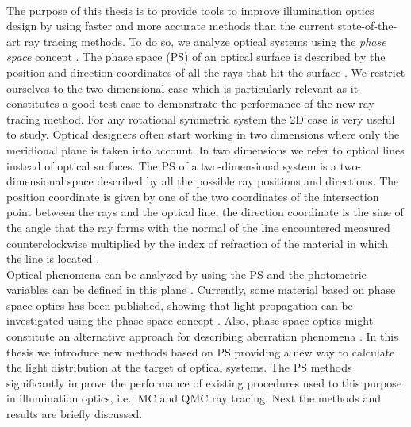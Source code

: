 \\ \indent The purpose of this thesis is to provide tools to improve illumination optics design by using faster and more accurate methods than the current state-of-the-art ray tracing methods.
To do so, we analyze optical systems using the \textit{phase space} concept \cite{torre2005linear}.
The phase space (PS) of an optical surface is described by the position and direction coordinates of all the rays that hit the surface \cite{testorf2009phase}. We restrict ourselves to the two-dimensional case which is particularly relevant as it constitutes a good test case to
demonstrate the performance of the new ray tracing method. For any rotational symmetric
system the 2D case is very useful to study. Optical designers often start working in two dimensions where only the
meridional plane is taken into account. In two dimensions we refer to optical lines instead of optical surfaces. The PS of a two-dimensional system is a two-dimensional space described by all the possible ray positions and directions. The position coordinate is given by one of the two coordinates of the intersection point between the rays and the optical line, the direction coordinate is the sine of the angle that the ray forms with the normal of the line encountered measured counterclockwise multiplied by the index of refraction of the material in which the line is located \cite{wolf2004geometric}. 
\\ \indent Optical phenomena can be analyzed by using the PS and the photometric variables can be defined in this plane \cite{rausch2014illumination}.  
Currently, some material based on phase space optics has been published, showing that light propagation can be investigated using the phase space concept \cite{rausch2012phase,rausch2014phase, herkommer2012phase}. Also, phase space optics might constitute an alternative approach for describing aberration phenomena \cite{herkommer2013phase, babington2017freeform, wolf1993relativistic}. In this thesis we introduce new methods based on PS providing a new way to calculate the light distribution at the target of optical systems. The PS methods significantly improve the performance of existing procedures used to this purpose in illumination optics, i.e., MC and QMC ray tracing. 
Next the methods and results are briefly discussed. 
